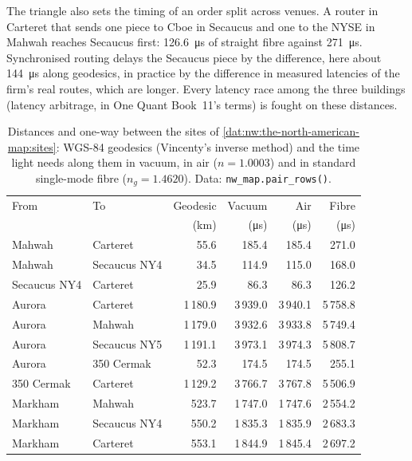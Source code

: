 The triangle also sets the timing of an order split across venues. A router in Carteret that sends one piece to Cboe in Secaucus and one to
the NYSE in Mahwah reaches Secaucus first: \qty{126.6}{\micro\second} of straight fibre against \qty{271}{\micro\second}. Synchronised routing
delays the Secaucus piece by the difference, here about \qty{144}{\micro\second} along geodesics, in practice by the difference in measured
latencies of the firm's real routes, which are longer. Every latency race among the three buildings (latency arbitrage, in One Quant Book~11's
terms) is fought on these distances.

\begin{table}[ht]
\centering\small
\begin{tabular}{llrrrr}
\toprule
From & To & Geodesic & Vacuum & Air & Fibre \\
 & & (km) & (\si{\micro\second}) & (\si{\micro\second}) & (\si{\micro\second}) \\
\midrule
Mahwah & Carteret & 55.6 & 185.4 & 185.4 & 271.0 \\
Mahwah & Secaucus NY4 & 34.5 & 114.9 & 115.0 & 168.0 \\
Secaucus NY4 & Carteret & 25.9 & 86.3 & 86.3 & 126.2 \\
Aurora & Carteret & 1\,180.9 & 3\,939.0 & 3\,940.1 & 5\,758.8 \\
Aurora & Mahwah & 1\,179.0 & 3\,932.6 & 3\,933.8 & 5\,749.4 \\
Aurora & Secaucus NY5 & 1\,191.1 & 3\,973.1 & 3\,974.3 & 5\,808.7 \\
Aurora & 350 Cermak & 52.3 & 174.5 & 174.5 & 255.1 \\
350 Cermak & Carteret & 1\,129.2 & 3\,766.7 & 3\,767.8 & 5\,506.9 \\
Markham & Mahwah & 523.7 & 1\,747.0 & 1\,747.6 & 2\,554.2 \\
Markham & Secaucus NY4 & 550.2 & 1\,835.3 & 1\,835.9 & 2\,683.3 \\
Markham & Carteret & 553.1 & 1\,844.9 & 1\,845.4 & 2\,697.2 \\
\bottomrule
\end{tabular}
\caption{Distances and one-way  between the sites of \cref{dat:nw:the-north-american-map:sites}: WGS-84 geodesics (Vincenty's
inverse method) and the time light needs along them in vacuum, in air ($n = 1.0003$) and in standard single-mode fibre ($n_g = 1.4620$).
Data: \texttt{nw\_map.pair\_rows()}.}\label{tab:nw:the-north-american-map:pairs}
\end{table}

